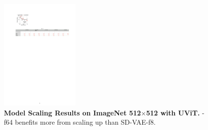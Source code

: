 \begin{figure}
  \vspace{-10pt}
  \begin{center}
    \includegraphics[width=0.35\textwidth]{figures/src/diffusion_scaling_up.pdf}
  \end{center}
  \vspace{-10pt}
  \caption{\textbf{Model Scaling Results on ImageNet 512$\times$512 with UViT.} \modelshort-f64 benefits more from scaling up than SD-VAE-f8.}
  \vspace{-20pt}
  \label{fig:diffusion_scaling_up}
\end{figure}
